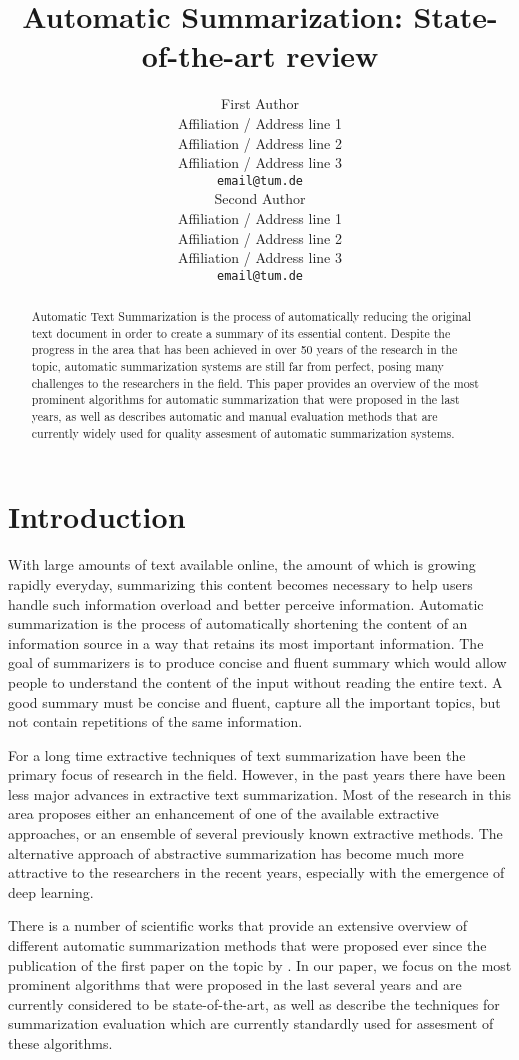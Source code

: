 \documentclass[11pt,a4paper,onecolumn]{article}
\title{Automatic Summarization: State-of-the-art review}
\author{First Author \\
  Affiliation / Address line 1 \\
  Affiliation / Address line 2 \\
  Affiliation / Address line 3 \\
  {\tt email@tum.de} \\\And
  Second Author \\
  Affiliation / Address line 1 \\
  Affiliation / Address line 2 \\
  Affiliation / Address line 3 \\
  {\tt email@tum.de} \\}
\date{}
\begin{document}
\maketitle
\begin{abstract}
Automatic Text Summarization is the process of automatically reducing the original text document in order to create a summary of its essential content.
Despite the progress in the area that has been achieved in over 50 years of the research in the topic, automatic summarization systems are still far from perfect, posing many challenges to the researchers in the field.
This paper provides an overview of the most prominent algorithms for automatic summarization that were proposed in the last years, as well as describes automatic and manual evaluation methods that are currently widely used for quality assesment of automatic summarization systems.
\end{abstract}


\section{Introduction}
With large amounts of text available online, the amount of which is growing rapidly everyday, summarizing this content becomes necessary to help users handle such information overload and better perceive information.
Automatic summarization is the process of automatically shortening the content of an information source in a way that retains its most important information.
The goal of summarizers is to produce concise and fluent summary which would allow people to understand the content of the input without reading the entire text.
A good summary must be concise and fluent, capture all the important topics, but not contain repetitions of the same information.

For a long time extractive techniques of text summarization have been the primary focus of research in the field.
However, in the past years there have been less major advances in extractive text summarization.
Most of the research in this area proposes either an enhancement of one of the available extractive approaches, or an ensemble of several previously known extractive methods.
The alternative approach of abstractive summarization has become much more attractive to the researchers in the recent years, especially with the emergence of deep learning.

There is a number of scientific works \cite{nenkova2011automatic, lloret2012text, saggion2013automatic} that provide an extensive overview of different automatic summarization methods that were proposed ever since the publication of the first paper on the topic by \cite{luhn1958automatic}.
In our paper, we focus on the most prominent algorithms that were proposed in the last several years and are currently considered to be state-of-the-art, as well as describe the techniques for summarization evaluation which are currently standardly used for assesment of these algorithms.
\end{document}
